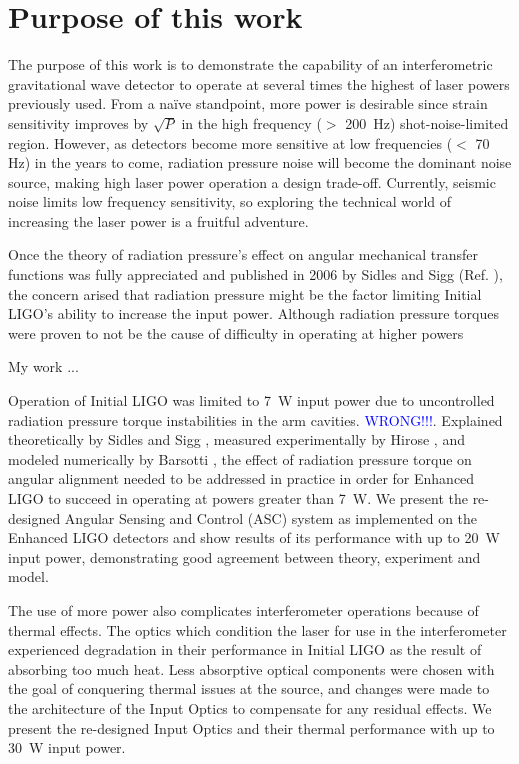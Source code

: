 \chapter{Purpose of this work}
The purpose of this work is to demonstrate the capability of an
interferometric gravitational wave detector to operate at several
times the highest of laser powers previously used. From a na\"ive
standpoint, more power is desirable since strain sensitivity improves
by $\sqrt{P}$ in the high frequency ($>$ 200~Hz) shot-noise-limited
region. However, as detectors become more sensitive at low frequencies
($<$ 70 Hz) in the years to come, radiation pressure noise will become
the dominant noise source, making high laser power operation a design
trade-off. Currently, seismic noise limits low frequency sensitivity,
so exploring the technical world of increasing the laser power is a
fruitful adventure.







Once the theory of radiation pressure's effect on angular mechanical
transfer functions was fully appreciated and published in 2006 by
Sidles and Sigg (Ref. \cite{Sidles2006Optical}), the concern arised that radiation
pressure might be the factor limiting Initial LIGO's ability to
increase the input power. Although radiation pressure torques were
proven to not be the cause of difficulty in operating at higher powers
\cite{Hirose2010Angular}

My work ...





Operation of Initial LIGO was limited to 7~W input power due to
uncontrolled radiation pressure torque instabilities in the arm
cavities. \textcolor{blue}{WRONG!!!}. Explained theoretically by Sidles and Sigg
\cite{Sidles2006Optical}, measured experimentally by Hirose
\cite{Hirose2010Angular}, and modeled numerically by Barsotti
\cite{Barsotti2009modeling}, the effect of radiation pressure torque
on angular alignment needed to be addressed in practice in order for
Enhanced LIGO to succeed in operating at powers greater than 7~W. We
present the re-designed Angular Sensing and Control (ASC) system as
implemented on the Enhanced LIGO detectors and show results of its
performance with up to 20~W input power, demonstrating good agreement
between theory, experiment and model.

The use of more power also complicates interferometer operations
because of thermal effects. The optics which condition the laser for
use in the interferometer experienced degradation in their performance
in Initial LIGO as the result of absorbing too much heat. Less
absorptive optical components were chosen with the goal of conquering
thermal issues at the source, and changes were made to the
architecture of the Input Optics to compensate for any residual
effects. We present the re-designed Input Optics and their thermal
performance with up to 30~W input power.

